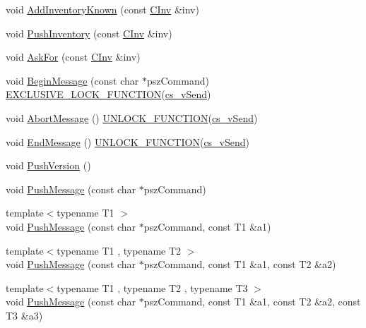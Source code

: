 \begin{DoxyCompactItemize}
\item 
void \hyperlink{class_c_node_ac3054eb6ade84e8968f032ce3e700f6a}{Add\+Inventory\+Known} (const \hyperlink{class_c_inv}{C\+Inv} \&inv)
\item 
void \hyperlink{class_c_node_a7cef2333aa8776127a7e7fcab659eb6a}{Push\+Inventory} (const \hyperlink{class_c_inv}{C\+Inv} \&inv)
\item 
void \hyperlink{class_c_node_ae0def1498409407d1612833a7d38c875}{Ask\+For} (const \hyperlink{class_c_inv}{C\+Inv} \&inv)
\item 
void \hyperlink{class_c_node_af76d193027757002321d0d674290b955}{Begin\+Message} (const char $\ast$psz\+Command) \hyperlink{threadsafety_8h_a77729163b7f6867da40ad5daa5f926f3}{E\+X\+C\+L\+U\+S\+I\+V\+E\+\_\+\+L\+O\+C\+K\+\_\+\+F\+U\+N\+C\+T\+I\+O\+N}(\hyperlink{class_c_node_a79edcac83fc5067567c7b41c26fcc56f}{cs\+\_\+v\+Send})
\item 
void \hyperlink{class_c_node_aae0fdfe555001a60bab8f216c3bc3978}{Abort\+Message} () \hyperlink{threadsafety_8h_abd56e19f9b4781b1a5212a46951cf5c3}{U\+N\+L\+O\+C\+K\+\_\+\+F\+U\+N\+C\+T\+I\+O\+N}(\hyperlink{class_c_node_a79edcac83fc5067567c7b41c26fcc56f}{cs\+\_\+v\+Send})
\item 
void \hyperlink{class_c_node_af8d4b8c0f883afffcb62d906c31b2cdf}{End\+Message} () \hyperlink{threadsafety_8h_abd56e19f9b4781b1a5212a46951cf5c3}{U\+N\+L\+O\+C\+K\+\_\+\+F\+U\+N\+C\+T\+I\+O\+N}(\hyperlink{class_c_node_a79edcac83fc5067567c7b41c26fcc56f}{cs\+\_\+v\+Send})
\item 
void \hyperlink{class_c_node_a4dbfe4f6c1fd162aaa905e4bd201d536}{Push\+Version} ()
\item 
void \hyperlink{class_c_node_a204fda3d33404cb37698c085b1583ab2}{Push\+Message} (const char $\ast$psz\+Command)
\item 
{\footnotesize template$<$typename T1 $>$ }\\void \hyperlink{class_c_node_a07f897794e362a214a1d4d2aa3d68939}{Push\+Message} (const char $\ast$psz\+Command, const T1 \&a1)
\item 
{\footnotesize template$<$typename T1 , typename T2 $>$ }\\void \hyperlink{class_c_node_a67b985781651b8806d7f9976f6fb85a9}{Push\+Message} (const char $\ast$psz\+Command, const T1 \&a1, const T2 \&a2)
\item 
{\footnotesize template$<$typename T1 , typename T2 , typename T3 $>$ }\\void \hyperlink{class_c_node_a79355956a00c38d855b986a34e7ba444}{Push\+Message} (const char $\ast$psz\+Command, const T1 \&a1, const T2 \&a2, const T3 \&a3)

\end{DoxyCompactItemize}

